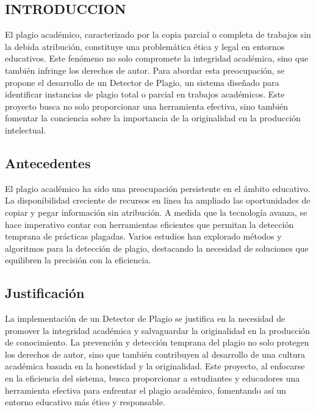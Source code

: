 \documentclass[a4paper]{article}
\begin{document}
\begin{multicols}{2}

\section{INTRODUCCION}

\begin{justify}

El plagio académico, caracterizado por la copia parcial o completa de trabajos sin la debida atribución, constituye una problemática ética y legal en entornos educativos. Este fenómeno no solo compromete la integridad académica, sino que también infringe los derechos de autor. Para abordar esta preocupación, se propone el desarrollo de un Detector de Plagio, un sistema diseñado para identificar instancias de plagio total o parcial en trabajos académicos. Este proyecto busca no solo proporcionar una herramienta efectiva, sino también fomentar la conciencia sobre la importancia de la originalidad en la producción intelectual.

\subsection{Antecedentes}

El plagio académico ha sido una preocupación persistente en el ámbito educativo. La disponibilidad creciente de recursos en línea ha ampliado las oportunidades de copiar y pegar información sin atribución. A medida que la tecnología avanza, se hace imperativo contar con herramientas eficientes que permitan la detección temprana de prácticas plagadas. Varios estudios han explorado métodos y algoritmos para la detección de plagio, destacando la necesidad de soluciones que equilibren la precisión con la eficiencia.

\subsection{Justificación}
La implementación de un Detector de Plagio se justifica en la necesidad de promover la integridad académica y salvaguardar la originalidad en la producción de conocimiento. La prevención y detección temprana del plagio no solo protegen los derechos de autor, sino que también contribuyen al desarrollo de una cultura académica basada en la honestidad y la originalidad. Este proyecto, al enfocarse en la eficiencia del sistema, busca proporcionar a estudiantes y educadores una herramienta efectiva para enfrentar el plagio académico, fomentando así un entorno educativo más ético y responsable.


\end{justify}
\end{multicols}
\end{document}
